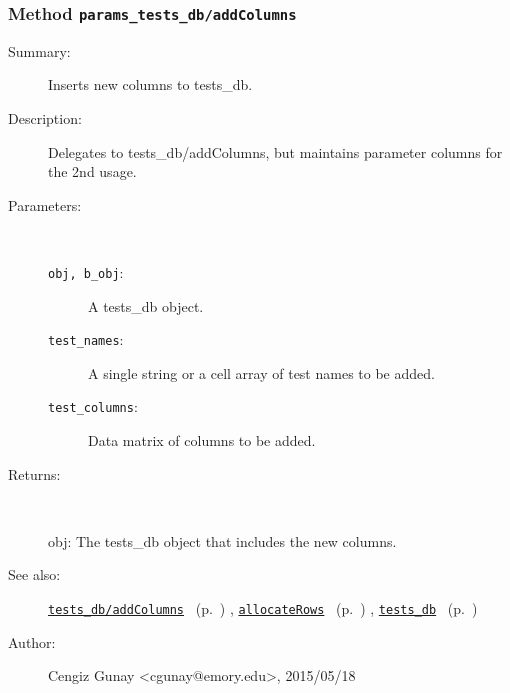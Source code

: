 \subsubsection[Method \texttt{addColumns}]{Method \texttt{params\_tests\_db/addColumns}}%
%
\label{ref_params_tests_db__addColumns}%
\hypertarget{ref_params_tests_db__addColumns}{}%
\begin{description}
\item[Summary:]Inserts new columns to tests\_db.
%
%
\item[Description:]%
Delegates to tests\_db/addColumns, but maintains parameter
 columns for the 2nd usage.
\item[Parameters:]~
\begin{description}%
\item[\texttt{obj, b\_obj}:]
 A tests\_db object.
\item[\texttt{test\_names}:]
 A single string or a cell array of test names to be added.
\item[\texttt{test\_columns}:]
 Data matrix of columns to be added.
\end{description}%
%
\item[Returns:
]~

   obj: The tests\_db object that includes the new columns.
%
%
\item[See also:]%
\hyperlink{ref_tests_db__addColumns}{\texttt{tests\_db/addColumns}}%
\ (p.~\pageref{ref_tests_db__addColumns})%
%
, \hyperlink{ref_allocateRows}{\texttt{allocateRows}}%
\ (p.~\pageref{ref_allocateRows})%
%
, \hyperlink{ref_tests_db}{\texttt{tests\_db}}%
\ (p.~\pageref{ref_tests_db})%
%
%
\item[Author:]%
Cengiz Gunay <cgunay@emory.edu>, 2015/05/18
%
\end{description}
\methodline%
